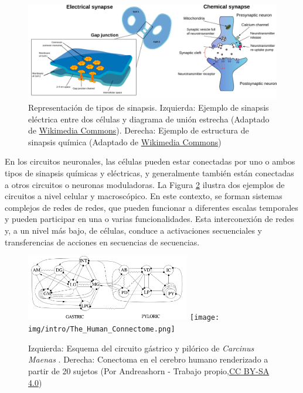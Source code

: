 \begin{figure}[hbt!]
	\centering
	\includegraphics[width=\linewidth]{img/intro/synapses.pdf}
	\caption{Representación de tipos de sinapsis. Izquierda: Ejemplo de sinapsis eléctrica entre dos células y diagrama de unión estrecha (Adaptado de \href{https://commons.wikimedia.org/wiki/File:Gap_cell_junction-en.svg}{Wikimedia Commons}). Derecha: Ejemplo de estructura de sinapsis química (Adaptado de \href{https://commons.wikimedia.org/wiki/File:Synapse_diag1.svg}{Wikimedia Commons})}
	\label{fig:synapse-types spanish}
\end{figure}

En los circuitos neuronales, las células pueden estar conectadas por uno o ambos tipos de sinapsis químicas y eléctricas, y generalmente también están conectadas a otros circuitos o neuronas moduladoras. La Figura \ref{fig:neural circuits spanish} ilustra dos ejemplos de circuitos a nivel celular y macroscópico. En este contexto, se forman sistemas complejos de redes de redes, que pueden funcionar a diferentes escalas temporales y pueden participar en una o varias funcionalidades. Esta interconexión de redes y, a un nivel más bajo, de células, conduce a activaciones secuenciales y transferencias de acciones en secuencias de secuencias.

\begin{figure}[hbt!]
	\centering
	\includegraphics[width=0.64\textwidth]{img/intro/cpg diagram.png}
	\texttt{[image: img/intro/The\_Human\_Connectome.png]}
	\caption{Izquierda: Esquema del circuito gástrico y pilórico de \textit{Carcinus Maenas} \parencite{huerta_topology_2001}. Derecha: Conectoma en el cerebro humano renderizado a partir de 20 sujetos (Por Andreashorn - Trabajo propio,\href{https://commons.wikimedia.org/w/index.php?curid=41581320}{CC BY-SA 4.0})}
	\label{fig:neural circuits spanish}
\end{figure}

